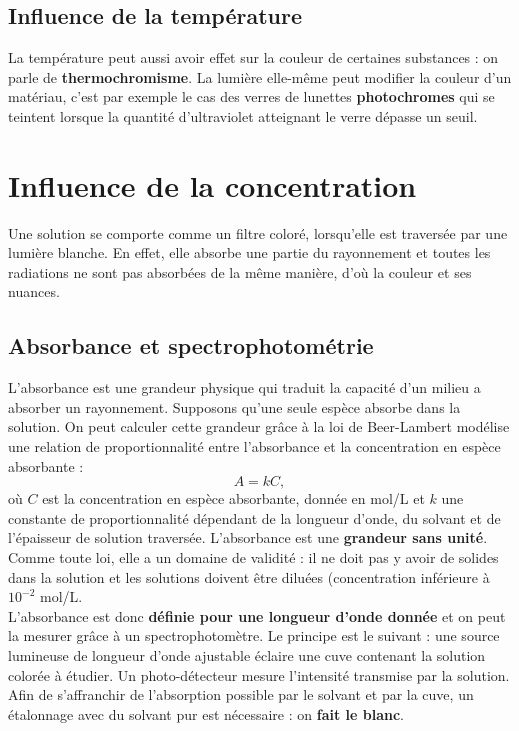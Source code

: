 \documentclass[11pt,a4paper]{report}
\begin{document}
\subsection{Influence de la température}

La température peut aussi avoir effet sur la couleur de certaines substances : on parle de \textbf{thermochromisme}. La lumière elle-même peut modifier la couleur d'un matériau, c'est par exemple le cas des verres de lunettes \textbf{photochromes} qui se teintent lorsque la quantité d'ultraviolet atteignant le verre dépasse un seuil.

\newpage
\section{Influence de la concentration}

Une solution se comporte comme un filtre coloré, lorsqu'elle est traversée par une lumière blanche. En effet, elle absorbe une partie du rayonnement et toutes les radiations ne sont pas absorbées de la même manière, d'où la couleur et ses nuances.

\subsection{Absorbance et spectrophotométrie}

L'absorbance est une grandeur physique qui traduit la capacité d'un milieu a absorber un rayonnement. Supposons qu'une seule espèce absorbe dans la solution. On peut calculer cette grandeur grâce à la loi de Beer-Lambert modélise une relation de proportionnalité entre l'absorbance et la concentration en espèce absorbante :
\begin{equation}
	\boxed{A = k C},
\end{equation}
où $C$ est la concentration en espèce absorbante, donnée en mol/L et $k$ une constante de proportionnalité dépendant de la longueur d'onde, du solvant et de l'épaisseur de solution traversée. L'absorbance est une \textbf{grandeur sans unité}. Comme toute loi, elle a un domaine de validité : il ne doit pas y avoir de solides dans la solution et les solutions doivent être diluées (concentration inférieure à $10^{-2}$ mol/L.\\

L'absorbance est donc \textbf{définie pour une longueur d'onde donnée} et on peut la mesurer grâce à un spectrophotomètre. Le principe est le suivant : une source lumineuse de longueur d'onde ajustable éclaire une cuve contenant la solution colorée à étudier. Un photo-détecteur mesure l'intensité transmise par la solution. Afin de s'affranchir de l'absorption possible par le solvant et par la cuve, un étalonnage avec du solvant pur est nécessaire : on \textbf{fait le blanc}.\\
\end{document}
